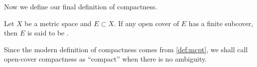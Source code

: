 Now we define our final definition of compactness.

\begin{definition}
    \label{def:mcpt}
    Let \(X\) be a metric space
    and \(E\subset X\).
    If any open cover of \(E\) has a finite subcover,
    then \(E\) is said to be
    .
\end{definition}

Since the modern definition of compactness comes from \cref{def:mcpt},
we shall call open-cover compactness as ``compact''
when there is no ambiguity.